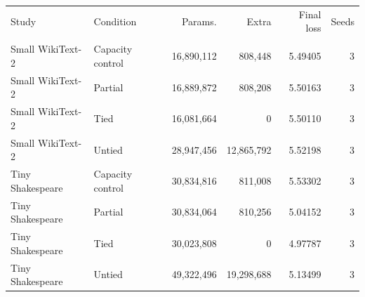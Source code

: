 \begin{tabular}{llrrrr}
\toprule
Study & Condition & Params. & Extra & Final loss & Seeds \\\\
\midrule
Small WikiText-2 & Capacity control & 16{,}890{,}112 & 808{,}448 & 5.49405 & 3 \\
Small WikiText-2 & Partial & 16{,}889{,}872 & 808{,}208 & 5.50163 & 3 \\
Small WikiText-2 & Tied & 16{,}081{,}664 & 0 & 5.50110 & 3 \\
Small WikiText-2 & Untied & 28{,}947{,}456 & 12{,}865{,}792 & 5.52198 & 3 \\
Tiny Shakespeare & Capacity control & 30{,}834{,}816 & 811{,}008 & 5.53302 & 3 \\
Tiny Shakespeare & Partial & 30{,}834{,}064 & 810{,}256 & 5.04152 & 3 \\
Tiny Shakespeare & Tied & 30{,}023{,}808 & 0 & 4.97787 & 3 \\
Tiny Shakespeare & Untied & 49{,}322{,}496 & 19{,}298{,}688 & 5.13499 & 3 \\
\bottomrule
\end{tabular}
